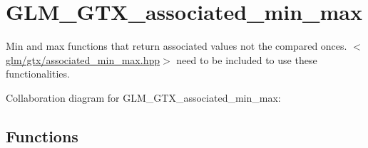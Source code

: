 \hypertarget{group__gtx__associated__min__max}{\section{G\-L\-M\-\_\-\-G\-T\-X\-\_\-associated\-\_\-min\-\_\-max}
\label{group__gtx__associated__min__max}
}


Min and max functions that return associated values not the compared onces. $<$\hyperlink{associated__min__max_8hpp}{glm/gtx/associated\-\_\-min\-\_\-max.\-hpp}$>$ need to be included to use these functionalities.  


Collaboration diagram for G\-L\-M\-\_\-\-G\-T\-X\-\_\-associated\-\_\-min\-\_\-max\-:
\subsection*{Functions}
